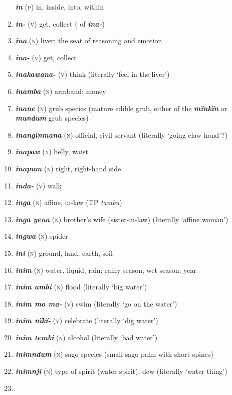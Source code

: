 \begin{enumerate}[noitemsep, label={}, align=left, widest=190, labelsep=1ex,leftmargin=*,itemindent=-10pt]
\textbf{\textit{in}} (\textsc{p}) in, inside, into, within \item 
\textbf{\textit{in-}} (\textsc{v}) get, collect (  of \textbf{\textit{ina-}}) \item 
\textbf{\textit{ina}} (\textsc{n}) liver; the seat of reasoning and emotion \item 
\textbf{\textit{ina-}} (\textsc{v}) get, collect \item 
\textbf{\textit{inakawana-}} (\textsc{v}) think (literally ‘feel in the liver’) \item 
\textbf{\textit{inamba}} (\textsc{n}) armband; money \item 
\textbf{\textit{inane}} (\textsc{n}) grub species (mature edible grub, either of the \textbf{\textit{mïnkïn}} or \textbf{\textit{mundum}} grub species) \item 
\textbf{\textit{inangïnmana}} (\textsc{n}) official, civil servant (literally ‘going claw hand’?) \item 
\textbf{\textit{inapaw}} (\textsc{n}) belly, waist \item 
\textbf{\textit{inapum}} (\textsc{n}) right, right-hand side \item 
\textbf{\textit{inda-}} (\textsc{v}) walk \item 
\textbf{\textit{inga}} (\textsc{n}) affine, in-law (TP \textit{tambu}) \item 
\textbf{\textit{inga yena}} (\textsc{n}) brother’s wife (sister-in-law) (literally ‘affine woman’) \item 
\textbf{\textit{ingwa}} (\textsc{n}) spider \item 
\textbf{\textit{ini}} (\textsc{n}) ground, land, earth, soil \item 
\textbf{\textit{inim}} (\textsc{n}) water, liquid, rain; rainy season, wet season; year \item 
\textbf{\textit{inim ambi}} (\textsc{n}) flood (literally ‘big water’) \item 
\textbf{\textit{inim mo ma-}} (\textsc{v}) swim (literally ‘go on the water’) \item 
\textbf{\textit{inim nïkï-}} (\textsc{v}) celebrate (literally ‘dig water’) \item 
\textbf{\textit{inim tembi}} (\textsc{n}) alcohol (literally ‘bad water’) \item 
\textbf{\textit{inimndum}} (\textsc{n}) sago species (small sago palm with short spines) \item 
\textbf{\textit{inimnji}} (\textsc{n}) type of spirit (water spirit); dew (literally ‘water thing’) \item 

\end{enumerate}

